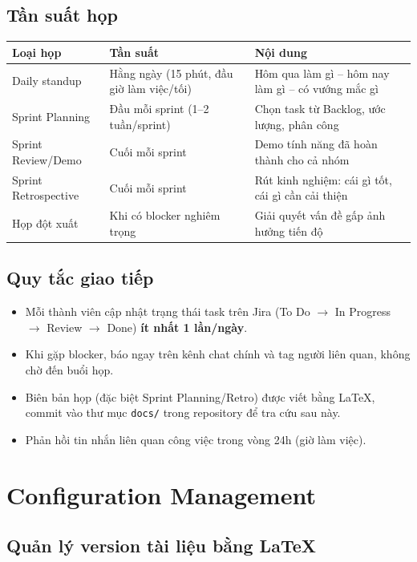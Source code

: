 \documentclass[a4paper,11pt]{article}
\begin{document}
\subsection{Tần suất họp}

\begin{longtable}{L{3.8cm} L{3.8cm} L{6.5cm}}
\toprule
\textbf{Loại họp} & \textbf{Tần suất} & \textbf{Nội dung} \\
\midrule
\endhead
Daily standup & Hằng ngày (15 phút, đầu giờ làm việc/tối) & Hôm qua làm gì -- hôm nay làm gì -- có vướng mắc gì \\
Sprint Planning & Đầu mỗi sprint (1--2 tuần/sprint) & Chọn task từ Backlog, ước lượng, phân công \\
Sprint Review/Demo & Cuối mỗi sprint & Demo tính năng đã hoàn thành cho cả nhóm \\
Sprint Retrospective & Cuối mỗi sprint & Rút kinh nghiệm: cái gì tốt, cái gì cần cải thiện \\
Họp đột xuất & Khi có blocker nghiêm trọng & Giải quyết vấn đề gấp ảnh hưởng tiến độ \\
\bottomrule
\end{longtable}

\subsection{Quy tắc giao tiếp}

\begin{itemize}[leftmargin=1.2cm]
  \item Mỗi thành viên cập nhật trạng thái task trên Jira (To Do $\rightarrow$ In Progress $\rightarrow$ Review $\rightarrow$ Done) \textbf{ít nhất 1 lần/ngày}.
  \item Khi gặp blocker, báo ngay trên kênh chat chính và tag người liên quan, không chờ đến buổi họp.
  \item Biên bản họp (đặc biệt Sprint Planning/Retro) được viết bằng LaTeX, commit vào thư mục \texttt{docs/} trong repository để tra cứu sau này.
  \item Phản hồi tin nhắn liên quan công việc trong vòng 24h (giờ làm việc).
\end{itemize}

\section{Configuration Management}

\subsection{Quản lý version tài liệu bằng LaTeX}
\end{document}
